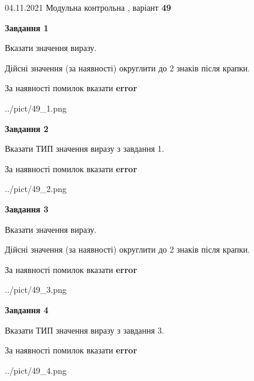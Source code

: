 \documentclass[11pt, ukrainian]{article}
\begin{document}
{04.11.2021 Модульна контрольна , варіант  \No \textbf { 49 }\par}
{
\begin {large}
{\begin {center}\textbf{Завдання 1}\end {center}}\par
Вказати значення виразу. \par
Дійсні значення (за наявності) округлити до 2 знаків після крапки. \par
За наявності помилок вказати \textbf{error}

\begin{center}
	{../pict/49_1.png}
\end{center}
\newpage

{\begin {center}\textbf{Завдання 2}\end {center}}\par
Вказати ТИП значення виразу з завдання 1. \par
За наявності помилок вказати \textbf{error}

\begin{center}
	{../pict/49_2.png}
\end{center}
\newpage

{\begin {center}\textbf{Завдання 3}\end {center}}\par
Вказати значення виразу. \par
Дійсні значення (за наявності) округлити до 2 знаків після крапки. \par
За наявності помилок вказати \textbf{error}

\begin{center}
	{../pict/49_3.png}
\end{center}
\newpage

{\begin {center}\textbf{Завдання 4}\end {center}}\par
Вказати ТИП значення виразу з завдання 3. \par
За наявності помилок вказати \textbf{error}

\begin{center}
	{../pict/49_4.png}
\end{center}
\newpage


\end{large}}
\end{document}
